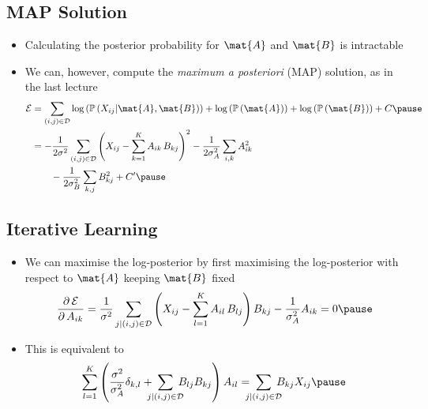 
\begin{slide}
\section{MAP Solution}

\begin{PauseHighLight}
  \begin{itemize}
  \item Calculating the posterior probability for $\mat{A}$ and
    $\mat{B}$ is intractable\pause
  \item We can, however, compute the \textit{maximum a posteriori}
    (MAP) solution, as in the last lecture
    \begin{align*}
      \mathcal{E} &=
      \sum_{(i,j)\in\mathcal{D}} \logg{\Prob{X_{ij}|\mat{A},\mat{B}}}
      + \logg{\Prob{\mat{A}}} + \logg{\Prob{\mat{B}}} + C \pause \\
      &= -\frac{1}{2\sigma^2} \sum_{(i,j)\in\mathcal{D}} \left( X_{ij} -
        \sum_{k=1}^K A_{ik} \, B_{kj} \right)^2
      - \frac{1}{2\sigma^2_A} \sum_{i,k} A_{ik}^2 \\
      & \hspace{2em}  - \frac{1}{2\sigma^2_B} \sum_{k,j} B_{kj}^2
      + C' \pause
    \end{align*}
  \end{itemize}
\end{PauseHighLight}

\end{slide}


\begin{slide}
\section[-1]{Iterative Learning}

\begin{PauseHighLight}
  \begin{itemize}
  \item We can maximise the log-posterior by first maximising the
    log-posterior with respect to $\mat{A}$ keeping $\mat{B}$ fixed
    \begin{align*}
      \pd{\mathcal{E}}{A_{ik}} = \frac{1}{\sigma^2}
      \sum_{j| (i,j)\in\mathcal{D}} \left( X_{ij} -
        \sum_{l=1}^K A_{il} \, B_{lj} \right)  B_{kj} -
      \frac{1}{\sigma^2_A} A_{ik} = 0\pause
    \end{align*}
  \item This is equivalent to
    \begin{align*}
      \sum_{l=1}^K \left( \frac{\sigma^2}{\sigma^2_A} \delta_{k,l}
        + \!\!\!\!\sum_{j| (i,j)\in\mathcal{D}}\!\!\!\! B_{lj}  B_{kj} \right) A_{il}
      = \!\!\!\!\sum_{j| (i,j)\in\mathcal{D}}\!\!\!\! B_{kj} X_{ij}\pause
    \end{align*}
  \end{itemize}
\end{PauseHighLight}

\end{slide}


